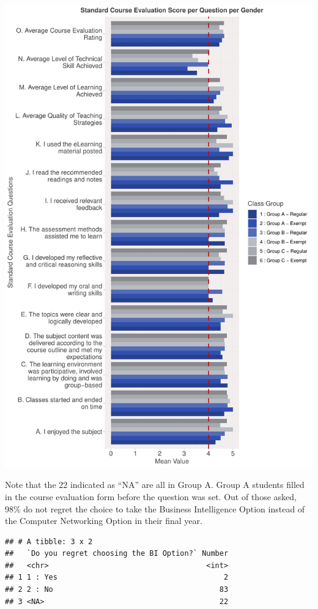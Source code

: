 \documentclass[
]{article}
\begin{document}
\includegraphics{10.b.BBT4206-End-SemesterCourseEvaluation-20230821-20231128-BI2-BBIT4-2_files/figure-latex/VisualizationsForCourseEvaluationResultsperGroup-1.pdf}

\newpage

Note that the 22 indicated as ``NA'' are all in Group A. Group A
students filled in the course evaluation form before the question was
set. Out of those asked, 98\% do not regret the choice to take the
Business Intelligence Option instead of the Computer Networking Option
in their final year.

\begin{verbatim}
## # A tibble: 3 x 2
##   `Do you regret choosing the BI Option?` Number
##   <chr>                                    <int>
## 1 1 : Yes                                      2
## 2 2 : No                                      83
## 3 <NA>                                        22
\end{verbatim}
\end{document}
